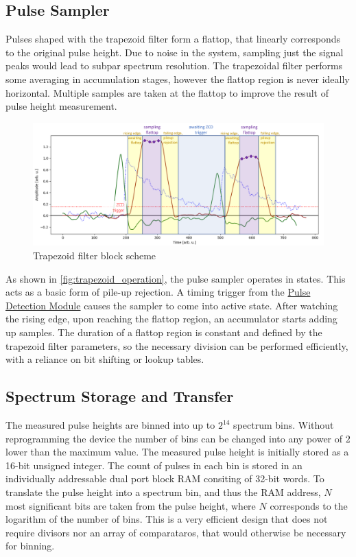 \documentclass[a4paper,12pt,table]{article}
\begin{document}
	\subsection{Pulse Sampler}\label{ssec:pulse_sampler}
		Pulses shaped with the trapezoid filter form a flattop, 
		that linearly corresponds to the original pulse height.
		Due to noise in the system, sampling just the signal peaks
		would lead to subpar spectrum resolution. 
		The trapezoidal filter performs some averaging in accumulation stages,
		however the flattop region is never ideally horizontal.
		Multiple samples are taken at the flattop to improve the 
		result of pulse height measurement.
		\begin{figure}[!ht]
			\centering
			\includegraphics[width=\textwidth]{img/trapezoid_operation.png}
			\caption{Trapezoid filter block scheme}\label{fig:trapezoid_operation}
		\end{figure}
		As shown in \autoref{fig:trapezoid_operation}, the pulse sampler operates in states.
		This acts as a basic form of pile-up rejection. 
		A timing trigger from the \hyperref[ssec:pulse_detection_module]{Pulse Detection Module}
		causes the sampler to come into active state. 
		After watching the rising edge, upon reaching the flattop region, 
		an accumulator starts adding up samples.
		The duration of a flattop region is constant and defined by the trapezoid filter parameters,
		so the necessary division can be performed efficiently, 
		with a reliance on bit shifting or lookup tables.
		\newpage
	\subsection{Spectrum Storage and Transfer}\label{ssec:spectrum_storage_and_transfer}
		The measured pulse heights are binned into up to $2^{14}$ spectrum bins. 
		Without reprogramming the device the number of bins can be changed 
		into any power of $2$ lower than the maximum value.
		The measured pulse height is initially stored as a 16-bit unsigned integer. 
		The count of pulses in each bin is stored in an individually addressable
		dual port block RAM consiting of 32-bit words. 
		To translate the pulse height into a spectrum bin, and thus the RAM address, 
		$N$ most significant bits are taken from the pulse height, where $N$
		corresponds to the logarithm of the number of bins. 
		This is a very efficient design that does not require 
		divisors nor an array of comparataros, that would otherwise be necessary for binning.
\end{document}
